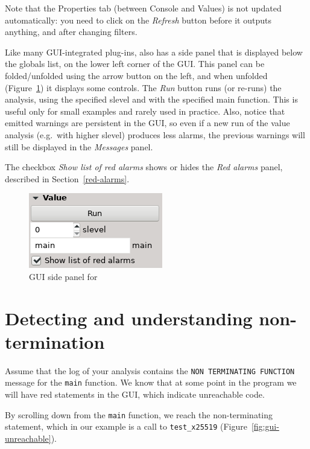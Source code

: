 Note that the Properties tab (between Console and Values) is not updated
automatically: you need to click on the \emph{Refresh} button before it
outputs anything, and after changing filters.

Like many GUI-integrated plug-ins, \Eva{} also has a side panel
that is displayed below the globals list, on the lower left corner of the GUI.
This panel can be folded/unfolded using the arrow button on the left,
and when unfolded (Figure~\ref{fig:gui-side-panel}) it displays some controls.
The {\em Run} button runs (or re-runs) the
analysis, using the specified slevel and with the specified main function.
This is useful only for small examples and rarely used in practice.
Also, notice that emitted warnings are persistent in the GUI, so even if a new
run of the value analysis (e.g.~with higher slevel) produces less alarms, the
previous warnings will still be displayed in the {\em Messages} panel.

The checkbox {\em Show list of red alarms} shows or hides the
{\em Red alarms} panel, described in Section~\ref{red-alarms}.

\begin{figure}
\centering
\includegraphics[scale=0.7]{gui-images/gui-side-panel.png}
\caption{GUI side panel for \Eva{}}
\label{fig:gui-side-panel}
\end{figure}


\section{Detecting and understanding non-termination}
\label{sec:non-termination-gui}

Assume that the log of your analysis contains the \texttt{NON\
  TERMINATING\ FUNCTION} message for the \texttt{main} function.
We know that
at some point in the program we will have red statements in the GUI,
which indicate unreachable code.

By scrolling down from the \texttt{main} function, we reach the
non-terminating statement, which in our example is a call to
\texttt{test\_x25519} (Figure~\ref{fig:gui-unreachable}).

